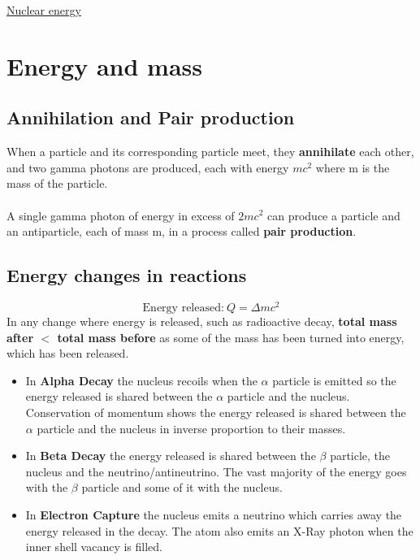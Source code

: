 \documentclass{article}[18pt]
\begin{document}
\begin{center}
\underline{\huge Nuclear energy}
\end{center}
\section{Energy and mass}
\subsection{Annihilation and Pair production}
When a particle and its corresponding particle meet, they \textbf{annihilate} each other, and two gamma photons are produced, each with energy $mc^2$ where m is the mass of the particle.\\
\\
A single gamma photon of energy in excess of $2mc^2$ can produce a particle and an antiparticle, each of mass m, in a process called \textbf{pair production}.
\subsection{Energy changes in reactions}
$$\textrm{Energy released:} \ Q=\Delta mc^2$$ 
In any change where energy is released, such as radioactive decay, \textbf{total mass after $<$ total mass before} as some of the mass has been turned into energy, which has been released.
\begin{itemize}
\item In \textbf{Alpha Decay} the nucleus recoils when the $\alpha$ particle is emitted so the energy released is shared between the $\alpha$ particle and the nucleus. Conservation of momentum shows the energy released is shared between the $\alpha$ particle and the nucleus in inverse proportion to their masses.
\item In \textbf{Beta Decay} the energy released is shared between the $\beta$ particle, the nucleus and the neutrino/antineutrino. The vast majority of the energy goes with the $\beta$ particle and some of it with the nucleus.
\item In \textbf{Electron Capture} the nucleus emits a neutrino which carries away the energy released in the decay. The atom also emits an X-Ray photon when the inner shell vacancy is filled.
\end{itemize}
\end{document}
